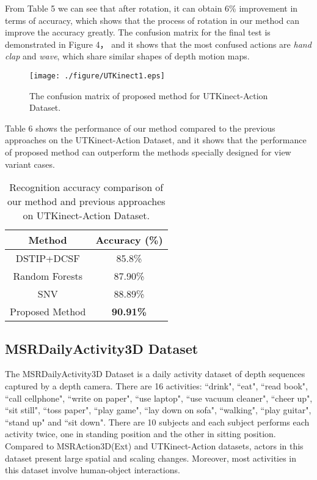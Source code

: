 \documentclass[conference]{IEEEtran}
\begin{document}
From Table 5 we can see that after rotation, it can obtain 6\% improvement in terms of accuracy, which shows that the process of rotation in our method can improve the accuracy greatly. The confusion matrix for the final test is demonstrated in Figure 4， and it shows that the most confused actions are \textit{hand clap} and \textit{ wave}, which share similar shapes of depth motion maps.
\begin{figure}[!ht]
\begin{center}{\texttt{[image: ./figure/UTKinect1.eps]}}
\end{center}
\caption{The confusion matrix of proposed method for UTKinect-Action Dataset.}
\label{fig:framework}
\end{figure}

Table 6 shows the performance of our method compared to the previous approaches on the UTKinect-Action Dataset, and it shows that the performance of proposed method can outperform the methods specially designed for view variant cases.

\begin{table}[h]
\centering
\caption{Recognition accuracy comparison of our method and previous approaches on  UTKinect-Action Dataset.}
\begin{tabular}{|c|c|}
\hline
Method & Accuracy (\%)\\
\hline
DSTIP+DCSF \cite{xia2013spatio} & 85.8\%  \\
\hline
Random Forests \cite{zhu2013fusing} & 87.90\%  \\
\hline
SNV \cite{yangsuper} & 88.89\%  \\
\hline
Proposed Method & \textbf{90.91\%}  \\
\hline
\end{tabular}
\end{table}

 



\subsection{MSRDailyActivity3D Dataset}
The MSRDailyActivity3D Dataset \cite{wang2012mining} is a daily activity dataset of depth sequences captured by a depth camera. There are 16 activities: ``drink", ``eat", ``read book", ``call cellphone", ``write on paper", ``use laptop", ``use vacuum cleaner", ``cheer up", ``sit still", ``toss paper", ``play game", ``lay down on sofa", ``walking", ``play guitar", ``stand up" and ``sit down". There are 10 subjects and each subject performs each activity twice, one in standing position and the other in sitting position. Compared to MSRAction3D(Ext) and UTKinect-Action datasets, actors in this dataset present large spatial and scaling changes. Moreover, most activities in this dataset involve human-object interactions. 
\end{document}
